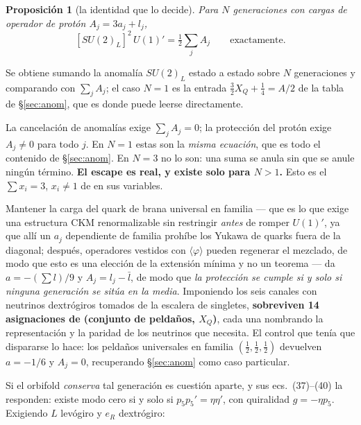 \documentclass[11pt,a4paper]{article}
\newtheorem{proposition}{Proposición}
\newcommand{\su}[1]{SU(#1)}
\begin{document}
\begin{proposition}[la identidad que lo decide]\label{prop:identity}
Para $N$ generaciones con cargas de operador de protón $A_j=3a_j+l_j$,
\[
[\su2_L]^2\,U(1)'=\tfrac12\sum_j A_j\qquad\text{exactamente}.
\]
\end{proposition}

\noindent
Se obtiene sumando la anomalía $\su2_L$ estado a estado sobre $N$ generaciones y comparando con
$\sum_jA_j$; el caso $N=1$ es la entrada $\tfrac32X_Q+\tfrac14=A/2$ de la tabla de \S\ref{sec:anom},
que es donde puede leerse directamente.

La cancelación de anomalías exige $\sum_j A_j=0$; la protección del protón exige $A_j\neq0$ para
todo $j$. En $N=1$ estas son la \emph{misma ecuación}, que es todo el contenido de \S\ref{sec:anom}.
En $N=3$ no lo son: una suma se anula sin que se anule ningún término. \textbf{El escape es real, y
existe solo para $N>1$.} Esto es el $\sum x_i=3$, $x_i\neq1$ de \cite{FamilyU1} en sus variables.

Mantener la carga del quark de brana universal en familia --- que es lo que exige una estructura CKM
renormalizable sin restringir \emph{antes} de romper $U(1)'$, ya que allí un $a_j$ dependiente de
familia prohíbe los Yukawa de quarks fuera de la diagonal; después, operadores vestidos con
$\langle\varphi\rangle$ pueden regenerar el mezclado, de modo que esto es una elección de la
extensión mínima y no un teorema --- da $a=-(\sum l)/9$ y $A_j=l_j-\bar l$, de modo que \emph{la protección se cumple si y solo si ninguna
generación se sitúa en la media}. Imponiendo los seis canales con neutrinos dextrógiros tomados de la
escalera de singletes, \textbf{sobreviven 14 asignaciones de (conjunto de peldaños, $X_Q$)}, cada una
nombrando la representación y la paridad de los neutrinos que necesita. El control que tenía que
dispararse lo hace: los peldaños universales en familia $(\tfrac12,\tfrac12,\tfrac12)$ devuelven
$a=-1/6$ y $A_j=0$, recuperando \S\ref{sec:anom} como caso particular.

Si el orbifold \emph{conserva} tal generación es cuestión aparte, y sus ecs.~(37)--(40) la responden:
existe modo cero si y solo si $p_5p_5'=\eta\eta'$, con quiralidad $g=-\eta p_5$. Exigiendo $L$
levógiro y $e_R$ dextrógiro:
\end{document}
